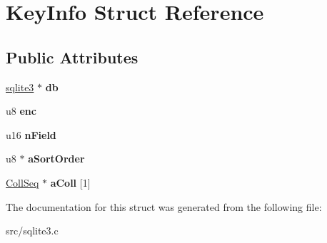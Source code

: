 \hypertarget{struct_key_info}{\section{Key\-Info Struct Reference}
\label{struct_key_info}
}
\subsection*{Public Attributes}
\begin{DoxyCompactItemize}
\item 
\hypertarget{struct_key_info_af2e7a3a411f5ca1ccf6de77d320b59db}{\hyperlink{structsqlite3}{sqlite3} $\ast$ {\bfseries db}}\label{struct_key_info_af2e7a3a411f5ca1ccf6de77d320b59db}

\item 
\hypertarget{struct_key_info_a37972825f9a148668e979be12465e832}{u8 {\bfseries enc}}\label{struct_key_info_a37972825f9a148668e979be12465e832}

\item 
\hypertarget{struct_key_info_af70436487a95e445d540bfc4ca1d3f0b}{u16 {\bfseries n\-Field}}\label{struct_key_info_af70436487a95e445d540bfc4ca1d3f0b}

\item 
\hypertarget{struct_key_info_ac5fe4bd0172a1f11f41f678528a7b21e}{u8 $\ast$ {\bfseries a\-Sort\-Order}}\label{struct_key_info_ac5fe4bd0172a1f11f41f678528a7b21e}

\item 
\hypertarget{struct_key_info_ad43aa024fca5a065e75d8e24b231adcb}{\hyperlink{struct_coll_seq}{Coll\-Seq} $\ast$ {\bfseries a\-Coll} \mbox{[}1\mbox{]}}\label{struct_key_info_ad43aa024fca5a065e75d8e24b231adcb}

\end{DoxyCompactItemize}


The documentation for this struct was generated from the following file\-:\begin{DoxyCompactItemize}
\item 
src/sqlite3.\-c\end{DoxyCompactItemize}
